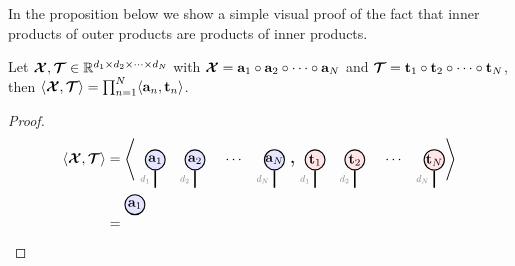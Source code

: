 In the proposition below we show a simple visual proof of the fact that inner products of outer products are products of inner products.
\begin{proposition}
    Let $\bm{\mathcal{X}},\bm{\mathcal{T}}\in\mathbb{R}^{d_1\times d_2\times\cdots\times d_N}$ with $\bm{\mathcal{X}} = \mathbf{a}_1\circ\mathbf{a}_2\circ\cdots\circ\mathbf{a}_N$ and $\bm{\mathcal{T}} = \mathbf{t}_1\circ\mathbf{t}_2\circ\cdots\circ\mathbf{t}_N$, then $\langle\bm{\mathcal{X}},\bm{\mathcal{T}}\rangle = \prod_{n=1}^N\langle\mathbf{a}_n,\mathbf{t}_n\rangle$.
\begin{proof}
\begin{align*}
\langle\Xt,\Tt\rangle
&=
\left\langle\begin{tikzpicture}[baseline=\baseline]
    \tikzset{tensor/.style = {minimum size = 0.5cm,shape = circle,thick,draw=black,inner sep = 0pt}, edge/.style   = {thick,line width=.4mm}}
    \def\y{0}
     \def\x{0}
\node[tensor,fill=blue!10!white] (a1) at (\x,\y){$\ab_1$};
\node[tensor,fill=blue!10!white](a2) at (\x+1,\y){$\ab_2$};
  \node[tensor,fill=blue!10!white](an) at (\x+3,\y){$\ab_N$};
    \draw[edge] (a1) -- (\x,\y-0.7) node [midway, left] {\scalebox{0.7}{\dimcolor{$d_1$}}};
    \draw[edge] (a2) -- (\x+1,\y-0.7) node [midway, left] {\scalebox{0.7}{\dimcolor{$d_2$}}};
    \draw[edge] (an) -- (\x+3,\y-0.7)  node [midway, left] {\scalebox{0.7}{\dimcolor{$d_N$}}};
    \node (eq) at (\x+2,\y) {$\cdots$};
\end{tikzpicture} \ \scalebox{1.5}{,}
\begin{tikzpicture}[baseline=\baseline]
    \tikzset{tensor/.style = {minimum size = 0.5cm,shape = circle,thick,draw=black,inner sep = 0pt}, edge/.style   = {thick,line width=.4mm}}
    \def\y{0}
     \def\x{0}
\node[tensor,fill=red!10!white] (t1) at (\x,\y){$\tb_1$};
\node[tensor,fill=red!10!white](t2) at (\x+1,\y){$\tb_2$};
  \node[tensor,fill=red!10!white](tn) at (\x+3,\y){$\tb_N$};
    \draw[edge] (t1) -- (\x,\y-0.7) node [midway, left] {\scalebox{0.7}{\dimcolor{$d_1$}}};
    \draw[edge] (t2) -- (\x+1,\y-0.7) node [midway, left] {\scalebox{0.7}{\dimcolor{$d_2$}}};
    \draw[edge] (tn) -- (\x+3,\y-0.7)  node [midway, left] {\scalebox{0.7}{\dimcolor{$d_N$}}};
    \node (eq) at (\x+2,\y) {$\cdots$};
\end{tikzpicture} 
\right\rangle\\
&=
\begin{tikzpicture}[baseline=\baseline]
    \tikzset{tensor/.style = {minimum size = 0.5cm,shape = circle,thick,draw=black,inner sep = 0pt}, edge/.style   = {thick,line width=.4mm}}
    \def\y{0}
     \def\x{0}
\node[tensor,fill=blue!10!white] (a1) at (\x,\y+0.5){$\ab_1$};

\end{tikzpicture}
\end{align*}
\end{proof}
\end{proposition}

